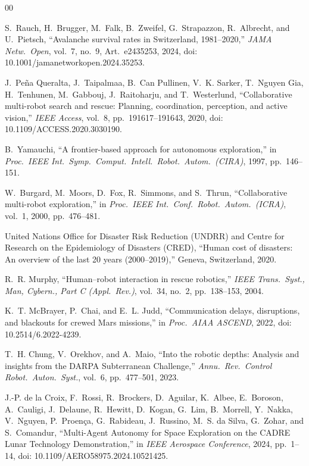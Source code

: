 \documentclass[conference]{IEEEtran}
\begin{document}
\begin{thebibliography}{00}

S.~Rauch, H.~Brugger, M.~Falk, B.~Zweifel, G.~Strapazzon,
R.~Albrecht, and U.~Pietsch,
``Avalanche survival rates in Switzerland, 1981--2020,''
\emph{JAMA Netw.\ Open}, vol.~7, no.~9, Art.~e2435253, 2024,
doi: 10.1001/jamanetworkopen.2024.35253.

J.~Pe\~na Queralta, J.~Taipalmaa, B.~Can Pullinen, V.~K. Sarker,
T.~Nguyen Gia, H.~Tenhunen, M.~Gabbouj, J.~Raitoharju, and
T.~Westerlund,
``Collaborative multi-robot search and rescue: Planning, coordination,
perception, and active vision,''
\emph{IEEE Access}, vol.~8, pp.~191617--191643, 2020,
doi: 10.1109/ACCESS.2020.3030190.

B.~Yamauchi, ``A frontier-based approach for autonomous exploration,''
in \emph{Proc.\ IEEE Int.\ Symp.\ Comput.\ Intell.\ Robot.\ Autom.\
(CIRA)}, 1997, pp.~146--151.

W.~Burgard, M.~Moors, D.~Fox, R.~Simmons, and S.~Thrun,
``Collaborative multi-robot exploration,''
in \emph{Proc.\ IEEE Int.\ Conf.\ Robot.\ Autom.\ (ICRA)}, vol.~1, 2000,
pp.~476--481.

United Nations Office for Disaster Risk Reduction (UNDRR) and
Centre for Research on the Epidemiology of Disasters (CRED),
``Human cost of disasters: An overview of the last 20 years
(2000--2019),'' Geneva, Switzerland, 2020.

R.~R. Murphy,
``Human--robot interaction in rescue robotics,''
\emph{IEEE Trans.\ Syst., Man, Cybern., Part C (Appl.\ Rev.)},
vol.~34, no.~2, pp.~138--153, 2004.

K.~T. McBrayer, P.~Chai, and E.~L. Judd,
``Communication delays, disruptions, and blackouts for crewed Mars missions,''
in \emph{Proc.\ AIAA ASCEND}, 2022, doi: 10.2514/6.2022-4239.

T.~H. Chung, V.~Orekhov, and A.~Maio,
``Into the robotic depths: Analysis and insights from the DARPA
Subterranean Challenge,''
\emph{Annu.\ Rev.\ Control Robot.\ Auton.\ Syst.}, vol.~6,
pp.~477--501, 2023.

J.-P. de la Croix, F.~Rossi, R.~Brockers, D.~Aguilar, K.~Albee,
E.~Boroson, A.~Cauligi, J.~Delaune, R.~Hewitt, D.~Kogan, G.~Lim,
B.~Morrell, Y.~Nakka, V.~Nguyen, P.~Proen\c{c}a, G.~Rabideau,
J.~Russino, M.~S. da Silva, G.~Zohar, and S.~Comandur,
``Multi-Agent Autonomy for Space Exploration on the CADRE Lunar
Technology Demonstration,''
in \emph{IEEE Aerospace Conference}, 2024, pp.~1--14,
doi: 10.1109/AERO58975.2024.10521425.


\end{thebibliography}
\end{document}
